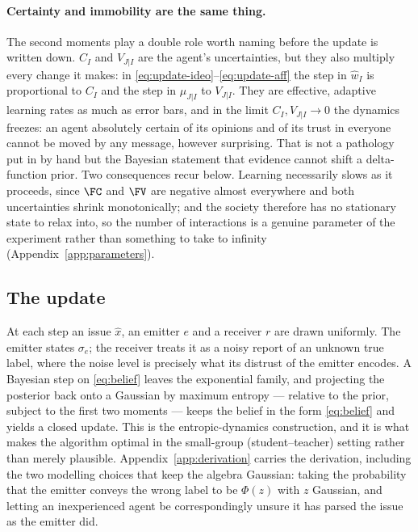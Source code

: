 \paragraph{Certainty and immobility are the same thing.} The second moments play a
double role worth naming before the update is written down. $C_I$ and $V_{J|I}$ are
the agent's uncertainties, but they also multiply every change it makes: in
\eqref{eq:update-ideo}--\eqref{eq:update-aff} the step in $\hat{w}_I$ is
proportional to $C_I$ and the step in $\mu_{J|I}$ to $V_{J|I}$. They are effective,
adaptive learning rates as much as error bars, and in the limit
$C_I, V_{J|I}\to0$ the dynamics freezes: an agent absolutely certain of its
opinions and of its trust in everyone cannot be moved by any message, however
surprising. That is not a pathology put in by hand but the Bayesian statement that
evidence cannot shift a delta-function prior. Two consequences recur below. Learning
necessarily slows as it proceeds, since $\FC$ and $\FV$ are negative almost
everywhere and both uncertainties shrink monotonically; and the society therefore
has no stationary state to relax into, so the number of interactions is a genuine
parameter of the experiment rather than something to take to infinity
(Appendix~\ref{app:parameters}).

\subsection{The update}
\label{sec:update}

At each step an issue $\hat{x}$, an emitter $e$ and a receiver $r$ are drawn
uniformly. The emitter states $\sigma_e$; the receiver treats it as a noisy report
of an unknown true label, where the noise level is precisely what its distrust of
the emitter encodes. A Bayesian step on \eqref{eq:belief} leaves the exponential
family, and projecting the posterior back onto a Gaussian by maximum entropy ---
relative to the prior, subject to the first two moments --- keeps the belief in the
form \eqref{eq:belief} and yields a closed update. This is the entropic-dynamics
construction, and it is what makes the algorithm optimal in the small-group
(student--teacher) setting rather than merely plausible.
Appendix~\ref{app:derivation} carries the derivation, including the two modelling
choices that keep the algebra Gaussian: taking the probability that the emitter
conveys the wrong label to be $\Phi(z)$ with $z$ Gaussian, and letting an
inexperienced agent be correspondingly unsure it has parsed the issue as the
emitter did.

